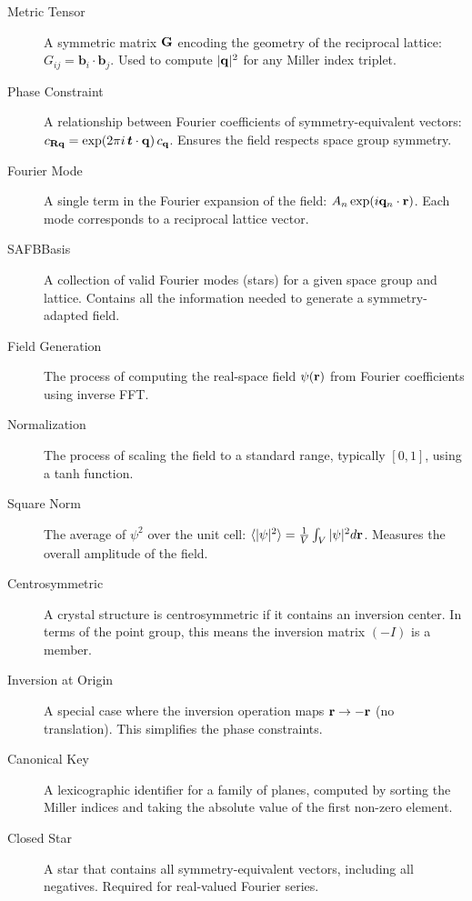 \begin{description}
\item[Metric Tensor] A symmetric matrix $\mathbf{G}$ encoding the geometry of the reciprocal lattice: $G_{ij} = \boldsymbol{b}_i \cdot \boldsymbol{b}_j$. Used to compute $|\mathbf{q}|^2$ for any Miller index triplet.

\item[Phase Constraint] A relationship between Fourier coefficients of symmetry-equivalent vectors: $c_{\mathbf{R} \mathbf{q}} = \exp(2\pi i \, \boldsymbol{t} \cdot \mathbf{q}) \, c_{\mathbf{q}}$. Ensures the field respects space group symmetry.

\item[Fourier Mode] A single term in the Fourier expansion of the field: $A_n \exp(i \mathbf{q}_n \cdot \mathbf{r})$. Each mode corresponds to a reciprocal lattice vector.

\item[SAFBBasis] A collection of valid Fourier modes (stars) for a given space group and lattice. Contains all the information needed to generate a symmetry-adapted field.

\item[Field Generation] The process of computing the real-space field $\psi(\mathbf{r})$ from Fourier coefficients using inverse FFT.

\item[Normalization] The process of scaling the field to a standard range, typically $[0, 1]$, using a tanh function.

\item[Square Norm] The average of $\psi^2$ over the unit cell: $\langle |\psi|^2 \rangle = \frac{1}{V} \int_V |\psi|^2 d\mathbf{r}$. Measures the overall amplitude of the field.

\item[Centrosymmetric] A crystal structure is centrosymmetric if it contains an inversion center. In terms of the point group, this means the inversion matrix $(-I)$ is a member.

\item[Inversion at Origin] A special case where the inversion operation maps $\mathbf{r} \to -\mathbf{r}$ (no translation). This simplifies the phase constraints.

\item[Canonical Key] A lexicographic identifier for a family of planes, computed by sorting the Miller indices and taking the absolute value of the first non-zero element.

\item[Closed Star] A star that contains all symmetry-equivalent vectors, including all negatives. Required for real-valued Fourier series.


\end{description}
